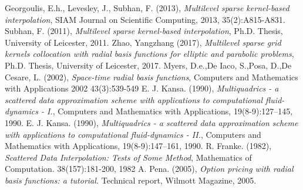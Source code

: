 \documentclass[a4paper]{amsart}
\begin{document}
\begin{thebibliography}{99}
 Georgoulis, E.h., Levesley, J., Subhan, F. (2013), {\em Multilevel sparse kernel-based interpolation}, SIAM Journal on Scientific Computing, 2013, 35(2):A815-A831.
 Subhan, F. (2011), {\em Multilevel sparse kernel-based interpolation}, Ph.D. Thesis, University of Leicester, 2011.
 Zhao, Yangzhang (2017), {\em Multilevel sparse grid kernels collocation with radial basis functions for elliptic and parabolic problems}, Ph.D. Thesis, University of Leicester, 2017.
 Myers, D.e.,De Iaco, S.,Posa, D.,De Cesare, L. (2002), {\em Space-time radial basis functions}, Computers and Mathematics with Applications 2002 43(3):539-549
 E. J. Kansa. (1990), {\em Multiquadrics - a scattered data approximation scheme
with applications to computational fluid-dynamics - I.}, Computers and Mathematics with Applications, 19(8-9):127–145, 1990.
 E. J. Kansa. (1990), {\em Multiquadrics - a scattered data approximation scheme
with applications to computational fluid-dynamics - II.}, Computers and Mathematics with Applications, 19(8-9):147–161, 1990.
 R. Franke. (1982), {\em Scattered Data Interpolation: Tests of Some Method}, Mathematics of Computation. 38(157):181-200, 1982
 A. Pena. (2005), {\em Option pricing with radial basis functions: a tutorial.} Technical
report, Wilmott Magazine, 2005.
\end{thebibliography}
\end{document}
